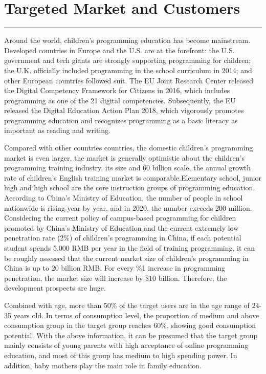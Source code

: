 \documentclass[12pt]{extarticle}
\numberwithin{figure}{section}
\begin{document}
\newpage
\section{Targeted Market and Customers}
\vspace{-0.1cm}
\hrule
\vspace{0.2cm}
Around the world, children's programming education has become mainstream. Developed countries in Europe and the U.S. are at the forefront: the U.S. government and tech giants are strongly supporting programming for children; the U.K. officially included programming in the school curriculum in 2014; and other European countries followed suit. The EU Joint Research Center released the Digital Competency Framework for Citizens in 2016, which includes programming as one of the 21 digital competencies. Subsequently, the EU released the Digital Education Action Plan 2018, which vigorously promotes programming education and recognizes programming as a basic literacy as important as reading and writing.

Compared with other countries countries, the domestic children's programming market is even larger, the market is generally optimistic about the children's programming training industry, its size and 60 billion scale, the annual growth rate of children's English training market is comparable.Elementary school, junior high and high school are the core instruction groups of programming education. According to China's Ministry of Education, the number of people in school nationwide is rising year by year, and in 2020, the number exceeds 200 million. Considering the current policy of campus-based programming for children promoted by China's Ministry of Education and the current extremely low penetration rate (2\%) of children's programming in China, if each potential student spends 5,000 RMB per year in the field of training programming, it can be roughly assessed that the current market size of children's programming in China is up to 20 billion RMB. For every \%1 increase in programming penetration, the market size will increase by \$10 billion. Therefore, the development prospects are huge.

Combined with age, more than 50\% of the target users are in the age range of 24-35 years old. In terms of consumption level, the proportion of medium and above consumption group in the target group reaches 60\%, showing good consumption potential. With the above information, it can be presumed that the target group mainly consists of young parents with high acceptance of online programming education, and most of this group has medium to high spending power. In addition, baby mothers play the main role in family education.
\end{document}
